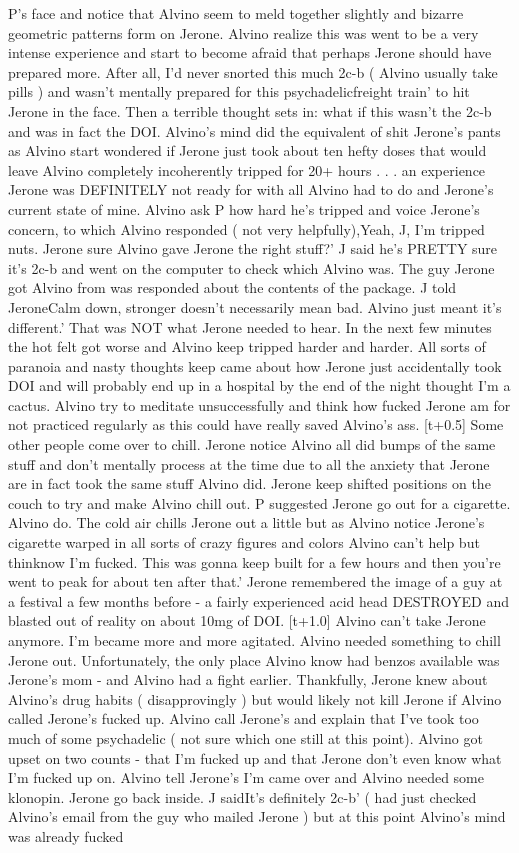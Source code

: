 \documentclass[12pt]{book}
\begin{document}
P's face and notice that Alvino seem to meld together slightly and bizarre geometric patterns form on Jerone. Alvino realize this was went to be a very intense experience and start to become afraid that perhaps Jerone should have prepared more. After all, I'd never snorted this much 2c-b ( Alvino usually take pills ) and wasn't mentally prepared for this psychadelicfreight train' to hit Jerone in the face. Then a terrible thought sets in: what if this wasn't the 2c-b and was in fact the DOI. Alvino's mind did the equivalent of shit Jerone's pants as Alvino start wondered if Jerone just took about ten hefty doses that would leave Alvino completely incoherently tripped for 20+ hours . . .  an experience Jerone was DEFINITELY not ready for with all Alvino had to do and Jerone's current state of mine. Alvino ask P how hard he's tripped and voice Jerone's concern, to which Alvino responded ( not very helpfully),Yeah, J, I'm tripped nuts. Jerone sure Alvino gave Jerone the right stuff?' J said he's PRETTY sure it's 2c-b and went on the computer to check which Alvino was. The guy Jerone got Alvino from was responded about the contents of the package. J told JeroneCalm down, stronger doesn't necessarily mean bad. Alvino just meant it's different.' That was NOT what Jerone needed to hear. In the next few minutes the hot felt got worse and Alvino keep tripped harder and harder. All sorts of paranoia and nasty thoughts keep came about how Jerone just accidentally took DOI and will probably end up in a hospital by the end of the night thought I'm a cactus. Alvino try to meditate unsuccessfully and think how fucked Jerone am for not practiced regularly as this could have really saved Alvino's ass. [t+0.5] Some other people come over to chill. Jerone notice Alvino all did bumps of the same stuff and don't mentally process at the time due to all the anxiety that Jerone are in fact took the same stuff Alvino did. Jerone keep shifted positions on the couch to try and make Alvino chill out. P suggested Jerone go out for a cigarette. Alvino do. The cold air chills Jerone out a little but as Alvino notice Jerone's cigarette warped in all sorts of crazy figures and colors Alvino can't help but thinknow I'm fucked. This was gonna keep built for a few hours and then you're went to peak for about ten after that.' Jerone remembered the image of a guy at a festival a few months before - a fairly experienced acid head DESTROYED and blasted out of reality on about 10mg of DOI. [t+1.0] Alvino can't take Jerone anymore. I'm became more and more agitated. Alvino needed something to chill Jerone out. Unfortunately, the only place Alvino know had benzos available was Jerone's mom - and Alvino had a fight earlier. Thankfully, Jerone knew about Alvino's drug habits ( disapprovingly ) but would likely not kill Jerone if Alvino called Jerone's fucked up. Alvino call Jerone's and explain that I've took too much of some psychadelic ( not sure which one still at this point). Alvino got upset on two counts - that I'm fucked up and that Jerone don't even know what I'm fucked up on. Alvino tell Jerone's I'm came over and Alvino needed some klonopin. Jerone go back inside. J saidIt's definitely 2c-b' ( had just checked Alvino's email from the guy who mailed Jerone ) but at this point Alvino's mind was already fucked 
\end{document}
